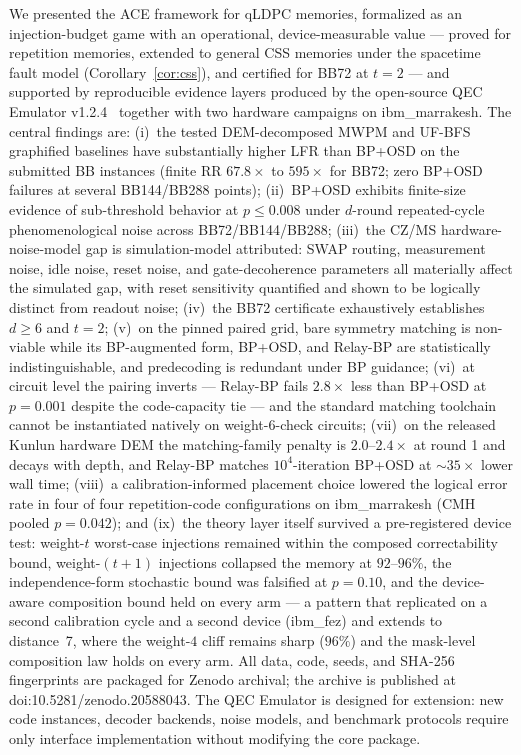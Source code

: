 \documentclass[11pt,a4paper]{article}
\begin{document}
We presented the ACE framework for qLDPC memories, formalized as an
injection-budget game with an operational, device-measurable value ---
proved for repetition memories, extended to general CSS memories under
the spacetime fault model (Corollary~\ref{cor:css}), and certified for
BB72 at $t=2$ --- and supported by reproducible evidence layers
produced by the open-source
QEC Emulator v1.2.4~\cite{AlDaajeh2026emulator} together with two
hardware campaigns on ibm\_marrakesh.
The central findings are:
(i)~the tested DEM-decomposed MWPM and UF-BFS graphified baselines have substantially higher LFR than BP+OSD on the submitted BB instances (finite RR $67.8\times$ to $595\times$ for BB72; zero BP+OSD failures at several BB144/BB288 points);
(ii)~BP+OSD exhibits finite-size evidence of sub-threshold behavior at $p\le0.008$ under
$d$-round repeated-cycle phenomenological noise across BB72/BB144/BB288;
(iii)~the CZ/MS hardware-noise-model gap is simulation-model attributed: SWAP routing, measurement noise, idle noise, reset noise, and gate-decoherence parameters all materially affect the simulated gap, with reset sensitivity quantified and shown to be logically distinct from readout noise;
(iv)~the BB72 certificate exhaustively establishes $d\ge6$ and $t=2$;
(v)~on the pinned paired grid, bare symmetry matching is non-viable while its BP-augmented form, BP+OSD, and Relay-BP are statistically indistinguishable, and predecoding is redundant under BP guidance;
(vi)~at circuit level the pairing inverts --- Relay-BP fails
$2.8\times$ less than BP+OSD at $p=0.001$ despite the code-capacity
tie --- and the standard matching toolchain cannot be instantiated
natively on weight-6-check circuits;
(vii)~on the released Kunlun hardware DEM the matching-family penalty
is $2.0$--$2.4\times$ at round 1 and decays with depth, and Relay-BP
matches $10^4$-iteration BP+OSD at $\sim\!35\times$ lower wall time;
(viii)~a calibration-informed placement choice lowered the logical
error rate in four of four repetition-code configurations on
ibm\_marrakesh (CMH pooled $p=0.042$);
and (ix)~the theory layer itself survived a pre-registered device test:
weight-$t$ worst-case injections remained within the composed
correctability bound, weight-$(t{+}1)$ injections collapsed the memory
at $92$--$96\%$, the independence-form stochastic bound was falsified
at $p=0.10$, and the device-aware composition bound held on every arm
--- a pattern that replicated on a second calibration cycle and a second
device (ibm\_fez) and extends to distance~7, where the weight-$4$
cliff remains sharp ($96\%$) and the mask-level composition law holds
on every arm.
All data, code, seeds, and SHA-256 fingerprints are packaged for Zenodo archival; the archive is published at doi:10.5281/zenodo.20588043.
The QEC Emulator is designed for extension: new code instances, decoder
backends, noise models, and benchmark protocols require only interface
implementation without modifying the core package.
\end{document}
